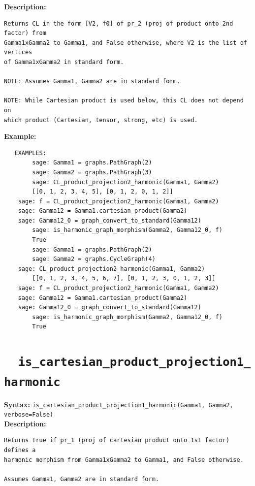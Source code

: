 \documentclass{article}
\begin{document}
\textbf{Description:}
\begin{verbatim}
Returns CL in the form [V2, f0] of pr_2 (proj of product onto 2nd factor) from 
Gamma1xGamma2 to Gamma1, and False otherwise, where V2 is the list of vertices
of Gamma1xGamma2 in standard form.

NOTE: Assumes Gamma1, Gamma2 are in standard form.

NOTE: While Cartesian product is used below, this CL does not depend on
which product (Cartesian, tensor, strong, etc) is used.
\end{verbatim}

\textbf{Example:}
\begin{verbatim}
   EXAMPLES:
        sage: Gamma1 = graphs.PathGraph(2)
        sage: Gamma2 = graphs.PathGraph(3)
        sage: CL_product_projection2_harmonic(Gamma1, Gamma2) 
        [[0, 1, 2, 3, 4, 5], [0, 1, 2, 0, 1, 2]]
	sage: f = CL_product_projection2_harmonic(Gamma1, Gamma2)
	sage: Gamma12 = Gamma1.cartesian_product(Gamma2)
	sage: Gamma12_0 = graph_convert_to_standard(Gamma12)  
        sage: is_harmonic_graph_morphism(Gamma2, Gamma12_0, f) 
        True
        sage: Gamma1 = graphs.PathGraph(2) 
        sage: Gamma2 = graphs.CycleGraph(4)
	sage: CL_product_projection2_harmonic(Gamma1, Gamma2) 
        [[0, 1, 2, 3, 4, 5, 6, 7], [0, 1, 2, 3, 0, 1, 2, 3]]
	sage: f = CL_product_projection2_harmonic(Gamma1, Gamma2)
	sage: Gamma12 = Gamma1.cartesian_product(Gamma2)
	sage: Gamma12_0 = graph_convert_to_standard(Gamma12)  
        sage: is_harmonic_graph_morphism(Gamma2, Gamma12_0, f) 
        True
\end{verbatim}

\section{\tt \ \ is\_cartesian\_product\_projection1\_harmonic}

\textbf{Syntax:} \verb}is_cartesian_product_projection1_harmonic(Gamma1, Gamma2, verbose=False)}\\

\textbf{Description:}
\begin{verbatim}
Returns True if pr_1 (proj of cartesian product onto 1st factor) defines a 
harmonic morphism from Gamma1xGamma2 to Gamma1, and False otherwise. 

Assumes Gamma1, Gamma2 are in standard form.
\end{verbatim}
\end{document}
